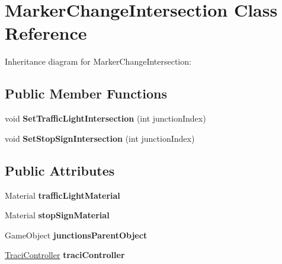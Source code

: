 \hypertarget{class_marker_change_intersection}{}\section{Marker\+Change\+Intersection Class Reference}
\label{class_marker_change_intersection}
Inheritance diagram for Marker\+Change\+Intersection\+:\begin{figure}[H]
\begin{center}
\leavevmode
\end{center}
\end{figure}
\subsection*{Public Member Functions}
\begin{DoxyCompactItemize}
\item 
\mbox{\label{class_marker_change_intersection_ad13999f647e99dd85053bb74d5cbad4e}} 
void {\bfseries Set\+Traffic\+Light\+Intersection} (int junction\+Index)
\item 
\mbox{\label{class_marker_change_intersection_acf79a51534ecd5d639aa4e79cf4418e4}} 
void {\bfseries Set\+Stop\+Sign\+Intersection} (int junction\+Index)
\end{DoxyCompactItemize}
\subsection*{Public Attributes}
\begin{DoxyCompactItemize}
\item 
\mbox{\label{class_marker_change_intersection_a81f82db0c84929002a8f04af8e2a4927}} 
Material {\bfseries traffic\+Light\+Material}
\item 
\mbox{\label{class_marker_change_intersection_adbc779cfa2fd782fba16e2e6002a2511}} 
Material {\bfseries stop\+Sign\+Material}
\item 
\mbox{\label{class_marker_change_intersection_ad1438eae0fe6455f37799021e86e8a8b}} 
Game\+Object {\bfseries junctions\+Parent\+Object}
\item 
\mbox{\label{class_marker_change_intersection_a3ed8b66198e70272d8c4bd4d26af43ca}} 
\mbox{\hyperlink{class_traci_controller}{Traci\+Controller}} {\bfseries traci\+Controller}
\end{DoxyCompactItemize}


